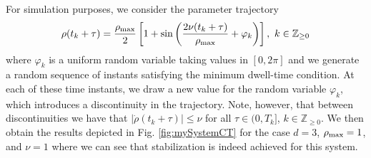\documentclass[12pt]{article}
\def\rmax{\rho_{\textnormal{max}}}
\def\T{\textnormal{T}}
\def\T{\intercal}
\begin{document}
For simulation purposes, we consider the  parameter trajectory
\begin{equation}\label{eq:param_phase}
  \rho(t_k+\tau)=\dfrac{\rho_{\textnormal{max}}}{2}\left[1+\sin\left(\dfrac{2\nu (t_k+\tau)}{\rho_{\textnormal{max}}}+\varphi_k\right)\right],\ k\in\mathbb{Z}_{\ge0}
\end{equation}
where $\varphi_k$ is a uniform random variable taking values in $[0,2\pi]$ and we generate a random sequence of instants satisfying the minimum dwell-time condition. At each of these time instants, we draw a new value for the random variable  $\varphi_k$, which introduces a discontinuity in the trajectory. Note, however, that between discontinuities we have that $|\dot{\rho}(t_k+\tau)|\le\nu$ for all $\tau\in(0,T_k]$, $k\in\mathbb{Z}_{\ge0}$. We then obtain the results depicted in Fig.  \ref{fig:mySystemCT} for the case $d=3$, $\rmax=1$, and $\nu=1$ where we can see that stabilization is indeed achieved for this system.
\end{document}

